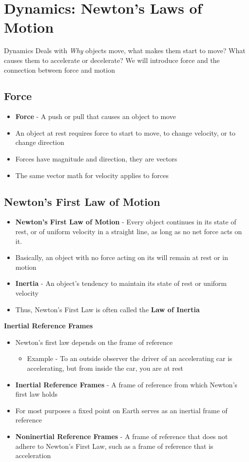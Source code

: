 \section{Dynamics: Newton's Laws of Motion}
Dynamics Deals with \emph{Why} objects move, what makes them start to move? What causes them to accelerate or decelerate? We will introduce force and the connection between force and motion

\subsection{Force}
\begin{itemize}
    \item \textbf{Force} - A push or pull that causes an object to move
    \item An object at rest requires force to start to move, to change velocity, or to change direction
    \item Forces have magnitude and direction, they are vectors
    \item The same vector math for velocity applies to forces
\end{itemize}

\subsection{Newton's First Law of Motion}
\begin{itemize}
    \item \textbf{Newton's First Law of Motion} - Every object continues in its state of rest, or of uniform velocity in a straight line, as long as no net force acts on it.
    \item Basically, an object with no force acting on its will remain at rest or in motion
    \item \textbf{Inertia} - An object's tendency to maintain its state of rest or uniform velocity 
    \item Thus, Newton's First Law is often called the \textbf{Law of Inertia}
\end{itemize}
\textbf{Inertial Reference Frames}
\begin{itemize}
    \item Newton's first law depends on the frame of reference
    \begin{itemize}
        \item Example - To an outside observer the driver of an accelerating car is accelerating, but from inside the car, you are at rest
    \end{itemize}
    \item \textbf{Inertial Reference Frames} - A frame of reference from which Newton's first law holds
    \item For most purposes a fixed point on Earth serves as an inertial frame of reference
    \item \textbf{Noninertial Reference Frames} - A frame of reference that does not adhere to Newton's First Law, such as a frame of reference that is acceleration
\end{itemize}

